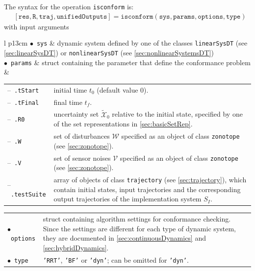 The syntax for the operation \texttt{isconform} is:
\begin{equation*}
\begin{split}
    & [\texttt{res}, \texttt{R}, \texttt{traj}, \texttt{unifiedOutputs}] = \texttt{isconform}(\texttt{sys},\texttt{params},\texttt{options},\texttt{type})
\end{split}
\end{equation*}
with input arguments

\begin{center}
\renewcommand{\arraystretch}{1.3}
\begin{tabular}[t]{l p{13cm} }
	$\bullet$~\texttt{sys} & dynamic system defined by one of the classes \texttt{linearSysDT} (see \cref{sec:linearSysDT}) or \texttt{nonlinearSysDT} (see \cref{sec:nonlinearSystemsDT}) \\
	$\bullet$~\texttt{params} & struct containing the parameter that define the conformance problem \\
	& \begin{tabular}[t]{l p{10cm}}
	 	--~\texttt{.tStart} & initial time $t_0$ (default value 0). \\
	 	--~\texttt{.tFinal} & final time $t_f$. \\
	 	--~\texttt{.R0} & uncertainty set $\tilde{\mathcal{X}}_0$ relative to the initial state, specified by one of the set representations in \cref{sec:basicSetRep}.\\
	 	--~\texttt{.W} & set of disturbances $\mathcal{W}$ specified as an object of class \texttt{zonotope} (see \cref{sec:zonotope}). \\
	 	--~\texttt{.V} & set of sensor noises $\mathcal{V}$ specified as an object of class \texttt{zonotope} (see \cref{sec:zonotope}).  \\
	 	--~\texttt{.testSuite} & array of objects of class \texttt{trajectory} (see \cref{sec:trajectory}), which contain initial states, input trajectories and the corresponding output trajectories of the implementation system $S_I$.
	 \end{tabular}
 \end{tabular}
\begin{tabular}[t]{l p{13cm} }
	$\bullet$~\texttt{options} & struct containing algorithm settings for conformance checking. Since the settings are different for each type of dynamic system, they are documented in \cref{sec:continuousDynamics} and \cref{sec:hybridDynamics}. \\
	 $\bullet$~\texttt{type} & \texttt{'RRT'}, \texttt{'BF'} or \texttt{'dyn'}; can be omitted for \texttt{'dyn'}.
\end{tabular}
\end{center}

